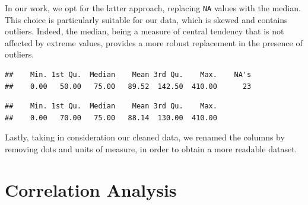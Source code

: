 \documentclass[
]{article}
\newenvironment{Shaded}{\begin{snugshade}}{\end{snugshade}}
\newcommand{\AttributeTok}[1]{\textcolor[rgb]{0.13,0.29,0.53}{#1}}
\newcommand{\CommentTok}[1]{\textcolor[rgb]{0.56,0.35,0.01}{\textit{#1}}}
\newcommand{\ConstantTok}[1]{\textcolor[rgb]{0.56,0.35,0.01}{#1}}
\newcommand{\FunctionTok}[1]{\textcolor[rgb]{0.13,0.29,0.53}{\textbf{#1}}}
\newcommand{\NormalTok}[1]{#1}
\newcommand{\OtherTok}[1]{\textcolor[rgb]{0.56,0.35,0.01}{#1}}
\newcommand{\SpecialCharTok}[1]{\textcolor[rgb]{0.81,0.36,0.00}{\textbf{#1}}}
\begin{document}
In our work, we opt for the latter approach, replacing \texttt{NA}
values with the median. This choice is particularly suitable for our
data, which is skewed and contains outliers. Indeed, the median, being a
measure of central tendency that is not affected by extreme values,
provides a more robust replacement in the presence of outliers.

\begin{Shaded}
\end{Shaded}

\begin{verbatim}
##    Min. 1st Qu.  Median    Mean 3rd Qu.    Max.    NA's 
##    0.00   50.00   75.00   89.52  142.50  410.00      23
\end{verbatim}

\begin{Shaded}
\end{Shaded}

\begin{verbatim}
##    Min. 1st Qu.  Median    Mean 3rd Qu.    Max. 
##    0.00   70.00   75.00   88.14  130.00  410.00
\end{verbatim}

Lastly, taking in consideration our cleaned data, we renamed the columns
by removing dots and units of measure, in order to obtain a more
readable dataset.

\section{Correlation Analysis}\label{correlation-analysis}
\end{document}
